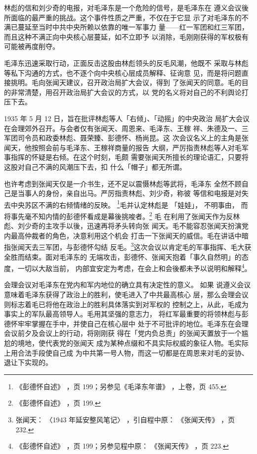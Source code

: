 林彪的信和刘少奇的电报，对毛泽东是一个危险的信号，是毛泽东在
遵义会议後所面临的最严重的挑战。这个事件性质之严重，不仅在于它显
示了对毛泽东的不满已蔓延至当时中共中央所赖以依靠的唯一军事力
量——红一军团和红三军团，而且这种不满正向中央核心层蔓延，如不立即予
以消除，毛刚刚获得的军权极有可能被再度削夺。

毛泽东迅速采取行动，正面反击这股由林彪领头的反毛风潮，他既不
采取与林彪等私下沟通的方式，也不逐个向中央核心层成员解释、征询意
见，而是将问题直接挑明。毛向张闻天建议，召开政治局扩大会议，得到
了张闻天的同意。毛的目的非常清楚，用召开政治局扩大会议的方式，以
党的名义将对自己的不利舆论打压下去。

1935 年 5 月 12 日，旨在批评林彪等人「右倾」、「动摇」的中央政治
局扩大会议在会理郊外召开。与会者仅有张闻天、周恩来、毛泽东、王稼
祥、朱德及一、三军团司令员和政委林彪、聂荣臻、彭德怀、杨尚昆。这
次会议名义上的主角是张闻天，他按照会前与毛泽东、王稼祥商量的报告
大纲，严厉指责林彪等人对毛军事指挥的怀疑是右倾。在这个时刻，毛颇
需要张闻天所擅长的理论语汇，只要将这股对自己不满的风潮压下去，扣
什么「帽子」都无所谓。

也许考虑到张闻天仅是一介书生，还不足以震慑林彪等武将，毛泽东
全然不顾自己是当事人的身份，亲自出马。严厉指责林彪、刘少奇，称彼
等信和电报是对失去中央苏区不满的右倾情绪的反映。 \footnote{《彭德怀自述》
，页 199；另参见《毛泽东年谱》
，上卷，页 455.}毛并认定林彪是
「娃娃」， 不明事由，
而将事先毫不知内情的彭德怀看成是幕後挑唆者。\footnote{《彭德怀自述》
，页 199.} 毛
在利用了张闻天作为反林彪、刘少奇的主攻手以後，迅速再将矛头转向张
闻天。毛不能容忍张闻天扮演党内最高仲裁者的角色，决意利用这个机会
打击一下张闻天的威信。毛在讲话中暗指张闻天去三军团，与彭德怀勾结
反毛。\footnote{张闻天：
〈1943 年延安整风笔记〉
，引自程中原：
《张闻天传》
，页 232.}这次会议以肯定毛的军事指挥、毛大获全胜而结束。面对毛泽东的
无端攻击，彭德怀、张闻天抱着「事久自然明」的态度，一切以大敌当前，
内部宜安定为考虑，在会上和会後都未予以说明和解释\footnote{《彭德怀自述》
，页 199；另参见程中原：
《张闻天传》
，页 223.}。

会理会议对毛泽东在党内和军内地位的确立具有决定性的意义。
如果
说遵义会议意味着毛泽东获得了政治上的胜利，使毛进入了中共最高核心
层，那么会理会议则标志着毛已将他在政治上的胜利具体落实到对军权的
控制之上，从此，毛成为事实上的军队最高领导人。毛用其坚强的意志力，
将红军最重要的将领林彪与彭德怀牢牢掌握在手中，并使自己在核心层中
处于不可批评的地位。毛泽东在会理会议前夕及会议上的行动，将刚刚获
得在「党内负总责」的张闻天置放于一个尴尬的境地，使代表党的张闻天
成为某种点缀和不具实际权威的象征人物。毛实际上用合法手段使自己成
为中共第一号人物，而这一切都是在周恩来对毛的妥协、退让下实现的。
 
